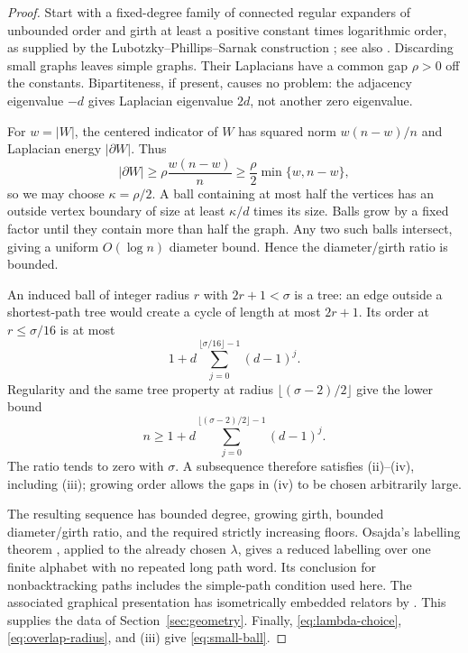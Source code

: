\begin{proof}
Start with a fixed-degree family of connected regular expanders of
unbounded order and girth at least a positive constant times logarithmic
order, as supplied by the Lubotzky--Phillips--Sarnak construction
\cite[Theorems~3.4 and~4.1]{LPS1988}; see also \cite[Section~2.4]{Osajda2020}. Discarding small
graphs leaves simple graphs. Their Laplacians have a common gap
\(\rho>0\) off the constants. Bipartiteness, if present, causes no
problem: the adjacency eigenvalue \(-d\) gives Laplacian eigenvalue
\(2d\), not another zero eigenvalue.

For \(w=|W|\), the centered indicator of \(W\) has squared norm
\(w(n-w)/n\) and Laplacian energy \(|\partial W|\). Thus
\[
|\partial W|\ge\rho\frac{w(n-w)}n
\ge\frac\rho2\min\{w,n-w\},
\]
so we may choose \(\kappa=\rho/2\). A ball containing at most half the
vertices has an outside vertex boundary of size at least \(\kappa/d\)
times its size. Balls grow by a fixed factor until they contain more than
half the graph. Any two such balls intersect, giving a uniform
\(O(\log n)\) diameter bound. Hence the diameter/girth ratio is bounded.

An induced ball of integer radius \(r\) with \(2r+1<\sigma\) is a
tree: an edge outside a shortest-path tree would create a cycle of
length at most \(2r+1\). Its order at \(r\le\sigma/16\) is at most
\[
1+d\sum_{j=0}^{\lfloor\sigma/16\rfloor-1}(d-1)^j.
\]
Regularity and the same tree property at radius
\(\lfloor(\sigma-2)/2\rfloor\) give the lower bound
\[
n\ge1+d\sum_{j=0}^{\lfloor(\sigma-2)/2\rfloor-1}(d-1)^j.
\]
The ratio tends to zero with \(\sigma\). A subsequence therefore satisfies
(ii)--(iv), including (iii); growing order allows the gaps in (iv) to be
chosen arbitrarily large.

The resulting sequence has bounded degree, growing girth, bounded
diameter/girth ratio, and the required strictly increasing floors.
Osajda's labelling theorem \cite[Theorem~2.7]{Osajda2020}, applied to the
already chosen \(\lambda\), gives a reduced labelling over one finite
alphabet with no repeated long path word. Its conclusion for
nonbacktracking paths includes the simple-path condition used here.
The associated graphical presentation has isometrically embedded
relators by \cite[Lemma~3.1 and Theorem~3.2]{Osajda2020}.
This supplies the data of Section~\ref{sec:geometry}. Finally,
\eqref{eq:lambda-choice}, \eqref{eq:overlap-radius}, and (iii) give
\eqref{eq:small-ball}.
\end{proof}

